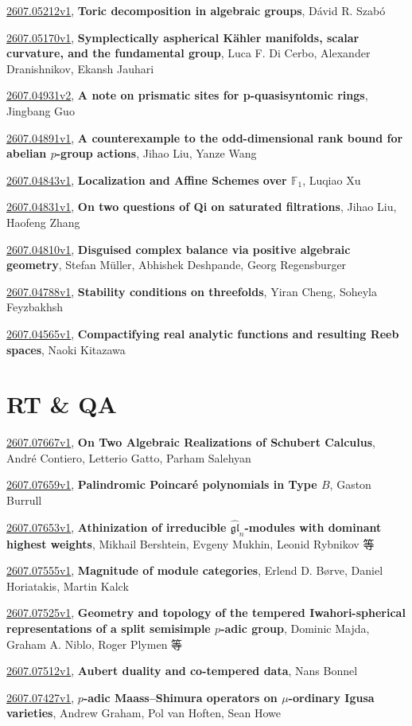 \documentclass[9pt, a4paper]{article}
\theoremstyle{plain}
\theoremstyle{definition}
\theoremstyle{remark}
\newcommand{\arxiv}[3]{\href{https://arxiv.org/abs/#1}{#1}, \textbf{\textcolor{arxivblue}{#2}}, #3}
\begin{document}
\arxiv{2607.05212v1}{Toric decomposition in algebraic groups}{Dávid R. Szabó}

\arxiv{2607.05170v1}{Symplectically aspherical Kähler manifolds, scalar curvature, and the fundamental group}{Luca F. Di Cerbo, Alexander Dranishnikov, Ekansh Jauhari}

\arxiv{2607.04931v2}{A note on prismatic sites for p-quasisyntomic rings}{Jingbang Guo}

\arxiv{2607.04891v1}{A counterexample to the odd-dimensional rank bound for abelian \texorpdfstring{$p$}{p}-group actions}{Jihao Liu, Yanze Wang}

\arxiv{2607.04843v1}{Localization and Affine Schemes over $\mathbb{F}_1$}{Luqiao Xu}

\arxiv{2607.04831v1}{On two questions of Qi on saturated filtrations}{Jihao Liu, Haofeng Zhang}

\arxiv{2607.04810v1}{Disguised complex balance via positive algebraic geometry}{Stefan Müller, Abhishek Deshpande, Georg Regensburger}

\arxiv{2607.04788v1}{Stability conditions on threefolds}{Yiran Cheng, Soheyla Feyzbakhsh}

\arxiv{2607.04565v1}{Compactifying real analytic functions and resulting Reeb spaces}{Naoki Kitazawa}


\section{RT \& QA}
\arxiv{2607.07667v1}{On Two Algebraic Realizations of Schubert Calculus}{André Contiero, Letterio Gatto, Parham Salehyan}

\arxiv{2607.07659v1}{Palindromic Poincaré polynomials in Type $B$}{Gaston Burrull}

\arxiv{2607.07653v1}{Athinization of irreducible $\widehat{\mathfrak{gl}}_n$-modules with dominant highest weights}{Mikhail Bershtein, Evgeny Mukhin, Leonid Rybnikov 等}

\arxiv{2607.07555v1}{Magnitude of module categories}{Erlend D. Børve, Daniel Horiatakis, Martin Kalck}

\arxiv{2607.07525v1}{Geometry and topology of the tempered Iwahori-spherical representations of a split semisimple $p$-adic group}{Dominic Majda, Graham A. Niblo, Roger Plymen 等}

\arxiv{2607.07512v1}{Aubert duality and co-tempered data}{Nans Bonnel}

\arxiv{2607.07427v1}{$p$-adic Maass--Shimura operators on $μ$-ordinary Igusa varieties}{Andrew Graham, Pol van Hoften, Sean Howe}
\end{document}
